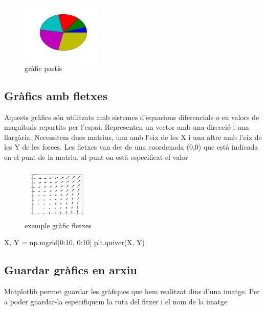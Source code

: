 \begin{figure}[!h]
    \begin{centering}
    \includegraphics[width=0.35\textwidth]{img/ex05.png}
    \caption{gràfic pastís}
    \label{fig:figex05}
    \end{centering}
\end{figure}
\subsection{Gràfics  amb fletxes}
Aquests gràfics són utilitzats amb sistemes d'equacions diferencials o en valors de magnituds repartits per l'espai. Representen un vector amb una direcció i una llargària. Necessitem dues matrius, una amb l'eix de les X i una altre amb l'eix de les Y de les forces. Les fletxes van des de una coordenada (0,0) que està indicada en el punt de la matriu, al punt on està especificat el valor

\begin{figure}[!h]
    \begin{centering}
    \includegraphics[width=0.3\textwidth]{img/ex06.png}
    \caption{exemple gràfic fletxes}
    \label{fig:figex06}
    \end{centering}
\end{figure}

\begin{tip}[caption=Gràfic fletxes]
X, Y = np.mgrid[0:10, 0:10]
plt.quiver(X, Y)
\end{tip}



\subsection{Guardar gràfics en arxiu}
Matplotlib permet guardar les gràfiques que hem realitzat dins d'una imatge. Per a poder guardar-la especifiquem la ruta del fitxer i el nom de la imatge

